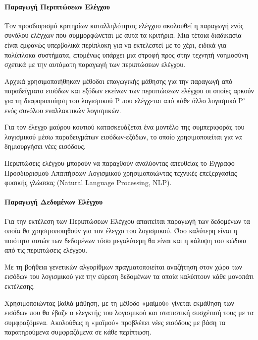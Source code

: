 \documentclass[12pt]{article}
\begin{document}
\paragraph{Παραγωγή Περιπτώσεων Ελέγχου}
Τον προσδιορισμό κριτηρίων καταλληλότητας ελέγχου ακολουθεί η παραγωγή ενός συνόλου ελέγχων που συμμορφώνεται με αυτά τα κριτήρια. Μια τέτοια διαδικασία είναι εμφανώς υπερβολικά περίπλοκη για να εκτελεστεί με το χέρι, ειδικά για πολύπλοκα συστήματα, επομένως υπάρχει μια στροφή προς στην τεχνητή νοημοσύνη σχετικά με την αυτόματη παραγωγή των περιπτώσεων ελέγχου.
\par Αρχικά χρησιμοποιήθηκαν μέθοδοι επαγωγικής μάθησης για την παραγωγή από παραδείγματα εισόδων και εξόδων εκείνων των περιπτώσεων ελέγχου οι οποίες αρκούν για τη διαφοροποίηση του λογισμικού P που ελέγχεται από κάθε άλλο λογισμικό P’ ενός συνόλου εναλλακτικών λογισμικών.
\par Για τον έλεγχο μαύρου κουτιού κατασκευάζεται ένα μοντέλο της συμπεριφοράς του λογισμικού μέσω παραδειγμάτων εισόδων-εξόδων, το οποίο χρησιμοποιείται για να δημιουργήσει νέες εισόδους.
\par Περιπτώσεις ελέγχου μπορούν να παραχθούν αναλύοντας απευθείας το Έγγραφο Προσδιορισμού Απαιτήσεων Λογισμικού χρησιμοποιώντας τεχνικές επεξεργασίας φυσικής γλώσσας (Natural Language Processing, NLP).

\paragraph{Παραγωγή Δεδομένων Ελέγχου}
Για την εκτέλεση των Περιπτώσεων Ελέγχου απαιτείται παραγωγή των δεδομένων τα οποία θα χρησιμοποιηθούν για τον έλεγχο του λογισμικού. Όσο καλύτερη είναι η ποιότητα αυτών των δεδομένων τόσο μεγαλύτερη θα είναι και η κάλυψη του κώδικα από τις περιπτώσεις ελέγχου.
\par Με τη βοήθεια γενετικών αλγορίθμων πραγματοποιείται αναζήτηση στον χώρο των εισόδων του λογισμικού για την εύρεση δεδομένων τα οποία καλύπτουν κάθε μονοπάτι εκτέλεσης.
\par Χρησιμοποιώντας βαθιά μάθηση, με τη μέθοδο «μαϊμού» γίνεται εκμάθηση των εισόδων που θα έβαζε ο ελεγκτής του λογισμικού και στατιστική συσχέτισή τους με τα συμφραζόμενα. Ακολούθως η «μαϊμού» προβλέπει νέες εισόδους με βάση τα παρατηρούμενα συμφραζόμενα σε κάθε περίπτωση.
\end{document}
